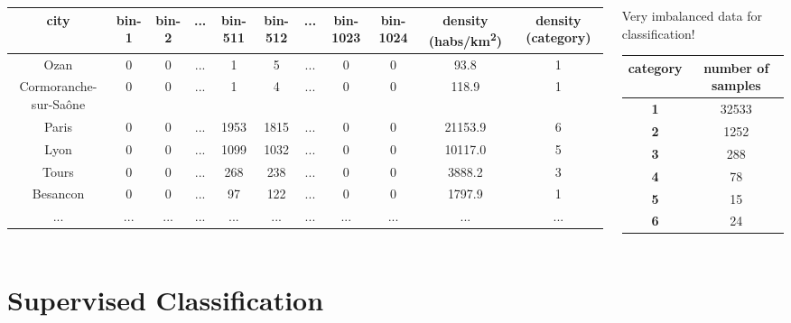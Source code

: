 \documentclass[c]{beamer}
\begin{document}
\begin{frame}
\begin{columns}
\begin{column}{0.8\textwidth}
\begin{table}
\begin{center}
\begin{adjustbox}{max width=0.9\textwidth}
\begin{tabular}{|c|c|c|c|c|c|c|c|c|c|c|}
\hline 
city &  bin-1 & bin-2 & ... & bin-511 & bin-512 &... & bin-1023 & bin-1024 & density (habs/km\textsuperscript{2})  & density (category)\\
\hline 
Ozan & 0 & 0 & ... & 1 & 5 & ... & 0 & 0 & 93.8 & 1\\
\hline 
Cormoranche-sur-Sa\^{o}ne & 0 & 0 & ... & 1 & 4 & ... & 0 & 0 & 118.9 & 1\\
\hline 
Paris & 0 & 0 & ... & 1953 & 1815 & ... & 0 & 0 & 21153.9 & 6\\
\hline
Lyon & 0 & 0 & ... & 1099 & 1032 & ... & 0 & 0 & 10117.0 & 5\\
\hline
Tours & 0 & 0 & ... & 268 & 238 & ... & 0 & 0 & 3888.2 & 3\\
\hline
Besancon & 0 & 0 & ... & 97 & 122 & ... & 0 & 0 & 1797.9 & 1\\
\hline 
... & ... & ... & ... & ... & ... & ... & ... & ... & ... & ... \\
\hline
\end{tabular}
\end{adjustbox}
\end{center}
\end{table}
\end{column}
\begin{column}{0.35\textwidth}
{\tiny
\begin{alertblock}{Very imbalanced data for classification!}
\begin{table}
 \begin{tabular}{|c|c|}
  \hline
  category & number of samples\\
  \hline
  \textbf{1} & 32533\\
  \hline
  \textbf{2} & 1252\\
  \hline
  \textbf{3} & 288\\
  \hline
  \textbf{4} & 78\\
  \hline
  \textbf{5} & 15\\
  \hline
  \textbf{6} & 24 \\
  \hline
 \end{tabular}
\end{table}
\end{alertblock}
}
\end{column}
\end{columns}
\end{frame}

\section{Supervised Classification}
\begin{frame}
\tableofcontents[currentsection]
\end{frame}
\end{document}
